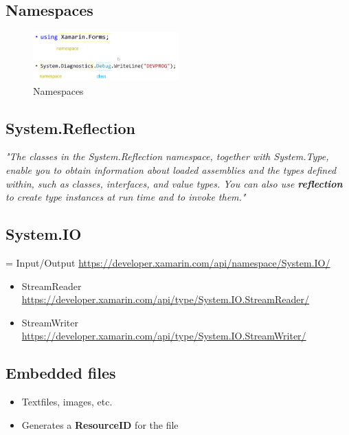 \documentclass{article}
\newcommand{\bold}[1]{\textbf{#1}}
\begin{document}
\subsection{Namespaces}

\begin{figure}[H]
    \centering
    \includegraphics[width=0.5\textwidth]{namespaces.png}
    \caption{Namespaces}
\end{figure}

\subsection{System.Reflection}

\textit{"The classes in the System.Reflection namespace, together with
System.Type, enable you to obtain information about loaded
assemblies and the types defined within, such as classes, interfaces,
and value types. You can also use \bold{reflection} to create type instances
at run time and to invoke them."}


\subsection{System.IO}

= Input/Output \url{https://developer.xamarin.com/api/namespace/System.IO/}

\begin{itemize}
    \item StreamReader \url{https://developer.xamarin.com/api/type/System.IO.StreamReader/}
    \item StreamWriter \url{https://developer.xamarin.com/api/type/System.IO.StreamWriter/}
\end{itemize}

\subsection{Embedded files}

\begin{itemize}
    \item Textfiles, images, etc.
    \item Generates a \bold{ResourceID} for the file
\end{itemize}
\end{document}
